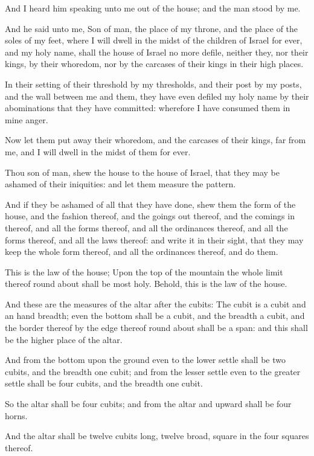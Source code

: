 \verse And I heard him speaking unto me out of the house; and the man stood by me.

\verse And he said unto me, Son of man, the place of my throne, and the place of the soles of my feet, where I will dwell in the midst of the children of Israel for ever, and my holy name, shall the house of Israel no more defile, neither they, nor their kings, by their whoredom, nor by the carcases of their kings in their high places.

\verse In their setting of their threshold by my thresholds, and their post by my posts, and the wall between me and them, they have even defiled my holy name by their abominations that they have committed: wherefore I have consumed them in mine anger.

\verse Now let them put away their whoredom, and the carcases of their kings, far from me, and I will dwell in the midst of them for ever.

\verse Thou son of man, shew the house to the house of Israel, that they may be ashamed of their iniquities: and let them measure the pattern.

\verse And if they be ashamed of all that they have done, shew them the form of the house, and the fashion thereof, and the goings out thereof, and the comings in thereof, and all the forms thereof, and all the ordinances thereof, and all the forms thereof, and all the laws thereof: and write it in their sight, that they may keep the whole form thereof, and all the ordinances thereof, and do them.

\verse This is the law of the house; Upon the top of the mountain the whole limit thereof round about shall be most holy. Behold, this is the law of the house.

\verse And these are the measures of the altar after the cubits: The cubit is a cubit and an hand breadth; even the bottom shall be a cubit, and the breadth a cubit, and the border thereof by the edge thereof round about shall be a span: and this shall be the higher place of the altar.

\verse And from the bottom upon the ground even to the lower settle shall be two cubits, and the breadth one cubit; and from the lesser settle even to the greater settle shall be four cubits, and the breadth one cubit.

\verse So the altar shall be four cubits; and from the altar and upward shall be four horns.

\verse And the altar shall be twelve cubits long, twelve broad, square in the four squares thereof.

